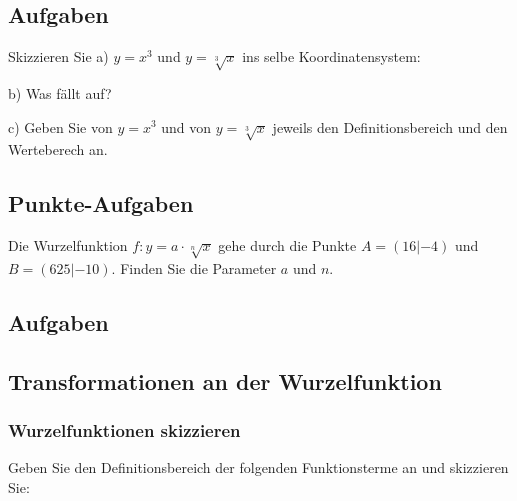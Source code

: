 \newpage
\subsection*{Aufgaben}
Skizzieren Sie
a) $y=x^3$ und $y=\sqrt[3]{x}$ ins selbe Koordinatensystem:


b) Was fällt auf?


c) Geben Sie von $y=x^3$ und von $y=\sqrt[3]{x}$ jeweils den
Definitionsbereich und den Werteberech an.


\newpage


\subsection{Punkte-Aufgaben}
Die Wurzelfunktion $f: y= a\cdot{} \sqrt[n]{x}$ gehe durch die Punkte
$A= (16 | -4)$ und $B=(625 | -10)$. Finden Sie die Parameter $a$ und
$n$.



\subsection*{Aufgaben}
\newpage


\subsection{Transformationen an der Wurzelfunktion}

\subsubsection{Wurzelfunktionen skizzieren}


Geben Sie den Definitionsbereich der folgenden Funktionsterme an und skizzieren Sie:


